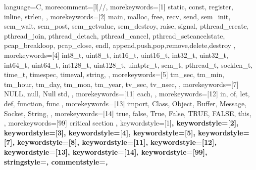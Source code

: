 {%
    language=C,%
    morecomment=[l]{//},%
    morekeywords=[1]{%
        static,
        const,
        register,
        inline,
        strlen,
    },%
    morekeywords=[2]{%
        main,
        malloc,
        free,
        recv,
        send,
        sem_init,
        sem_wait,
        sem_post,
        sem_getvalue,
        sem_destroy,
        raise,
        signal,
        pthread_create,
        pthread_join,
        pthread_detach,
        pthread_cancel,
        pthread_setcancelstate,
        pcap_breakloop,
        pcap_close,
        endl,
        append,push,pop,remove,delete,destroy
    },%
    morekeywords=[4]{%
        int8_t,
        uint8_t,
        int16_t,
        uint16_t,
        int32_t,
        uint32_t,
        int64_t,
        uint64_t,
        int128_t,
        uint128_t,
        uintptr_t,
        sem_t,
        pthread_t,
        socklen_t,
        time_t,
        timespec,
        timeval,
        string,
    },%
    morekeywords=[5]{%
        tm_sec,
        tm_min,
        tm_hour,
        tm_day,
        tm_mon,
        tm_year,
        tv_sec,
        tv_nsec,
    },%
    morekeywords=[7]{%
        NULL, null, Null
        std,
    },%
    morekeywords=[11]{%
        each, 
    },%
    morekeywords=[12]{%
        in, of, let, def,
        function, func
    },%
    morekeywords=[13]{%
        import,
        Class, Object,
        Buffer, Message,
        Socket, String,
    },%
    morekeywords=[14]{%
        true, false, True, False, TRUE, FALSE,
        this,
    },%
    morekeywords=[99]{%
        critical section
    },%
    keywordstyle=[1]\color{lstCol_C_purple}\bfseries,%
    keywordstyle=[2]\color{lstCol_C_violet}\bfseries,%
    keywordstyle=[3]\color{lstCol_C_purple},%
    keywordstyle=[4]\color{lstCol_C_green},%
    keywordstyle=[5]\color{lstCol_C_blue},%
    keywordstyle=[7]\color{lstCol_C_purple},%
    keywordstyle=[8]\color{lstCol_C_violet},%
    keywordstyle=[11]\color{lstCol_C_foreign1}\bfseries,%
    keywordstyle=[12]\color{lstCol_C_foreign2}\bfseries,%
    keywordstyle=[13]\color{lstCol_C_object},%
    keywordstyle=[14]\color{lstCol_C_moreKey},%
    keywordstyle=[99]\color{red}\bfseries,%
    stringstyle=\color{eclipse_1_string},%
    commentstyle=\color{eclipse_1_comment}\itshape,%
}%
